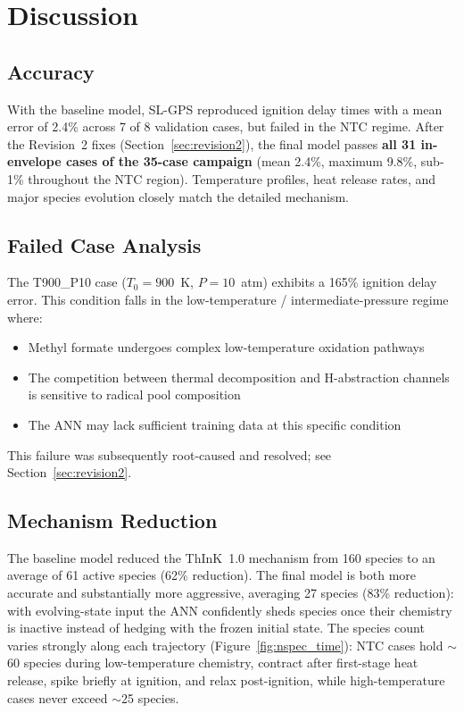 \documentclass[11pt,a4paper]{article}
\begin{document}
\section{Discussion}
\label{sec:discussion}

\subsection{Accuracy}

With the baseline model, SL-GPS reproduced ignition delay times with a mean
error of 2.4\% across 7 of 8 validation cases, but failed in the NTC regime.
After the Revision~2 fixes (Section~\ref{sec:revision2}), the final model
passes \textbf{all 31 in-envelope cases of the 35-case campaign} (mean 2.4\%,
maximum 9.8\%, sub-1\% throughout the NTC region). Temperature profiles, heat
release rates, and major species evolution closely match the detailed
mechanism.

\subsection{Failed Case Analysis}

The T900\_P10 case ($T_0=900$~K, $P=10$~atm) exhibits a 165\% ignition delay error. This condition falls in the low-temperature / intermediate-pressure regime where:
\begin{itemize}
    \item Methyl formate undergoes complex low-temperature oxidation pathways
    \item The competition between thermal decomposition and H-abstraction channels is sensitive to radical pool composition
    \item The ANN may lack sufficient training data at this specific condition
\end{itemize}
This failure was subsequently root-caused and resolved; see Section~\ref{sec:revision2}.

\subsection{Mechanism Reduction}

The baseline model reduced the ThInK~1.0 mechanism from 160 species to an
average of 61 active species (62\% reduction). The final model is both more
accurate and substantially more aggressive, averaging 27 species (83\%
reduction): with evolving-state input the ANN confidently sheds species once
their chemistry is inactive instead of hedging with the frozen initial state.
The species count varies strongly along each trajectory (Figure~\ref{fig:nspec_time}):
NTC cases hold $\sim$60 species during low-temperature chemistry, contract
after first-stage heat release, spike briefly at ignition, and relax
post-ignition, while high-temperature cases never exceed $\sim$25 species.
\end{document}
